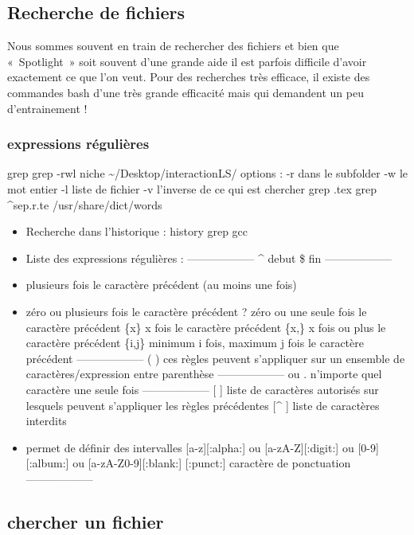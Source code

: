 \subsection{Recherche de fichiers}\label{recherche-de-fichiers}

Nous sommes souvent en train de rechercher des fichiers et bien que
«~Spotlight~» soit souvent d'une grande aide il est parfois difficile
d'avoir exactement ce que l'on veut. Pour des recherches très efficace,
il existe des commandes bash d'une très grande efficacité mais qui
demandent un peu d'entrainement !

\subsubsection{expressions
régulières}\label{expressions-ruxe9guliuxe8res}

grep grep -rwl niche \textasciitilde{}/Desktop/interactionLS/ options :
-r dans le subfolder -w le mot entier -l liste de fichier -v l'inverse
de ce qui est chercher grep .tex grep \^{}sep.r.te /usr/share/dict/words

\begin{itemize}
\item
  Recherche dans l'historique : history \textbar{} grep gcc
\item
  Liste des expressions régulières : ------------------ \^{} debut \$
  fin ------------------
\item
  plusieurs fois le caractère précédent (au moins une fois)
\item
  zéro ou plusieurs fois le caractère précédent ? zéro ou une seule fois
  le caractère précédent \{x\} x fois le caractère précédent \{x,\} x
  fois ou plus le caractère précédent \{i,j\} minimum i fois, maximum j
  fois le caractère précédent ------------------ ( ) ces règles peuvent
  s'appliquer sur un ensemble de caractères/expression entre parenthèse
  ------------------ \textbar{} ou . n'importe quel caractère une seule
  fois ------------------ {[} {]} liste de caractères autorisés sur
  lesquels peuvent s'appliquer les règles précédentes {[}\^{} {]} liste
  de caractères interdits
\item
  permet de définir des intervalles {[}a-z{]}{[}:alpha:{]} ou
  {[}a-zA-Z{]}{[}:digit:{]} ou {[}0-9{]}{[}:album:{]} ou
  {[}a-zA-Z0-9{]}{[}:blank:{]} {[}:punct:{]} caractère de ponctuation
  ------------------
\end{itemize}

\subsection{chercher un fichier}\label{chercher-un-fichier}

